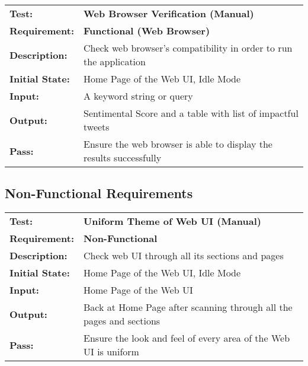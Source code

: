 \documentclass{article}
\begin{document}
	\begin{mdframed}[linewidth=1pt]%
	\begin{tabularx}{\textwidth}{@{}p{3cm}X@{}}
	{\bf Test:} & {\bf Web Browser Verification (Manual)}\\[\baselineskip]
	{\bf Requirement:} & {\bf Functional (Web Browser)}\\[\baselineskip]
	{\bf Description:} & Check web browser's compatibility in order to run the application\\[0.5\baselineskip]
	{\bf Initial State:} &  Home Page of the Web UI, Idle Mode\\[0.5\baselineskip]
	{\bf Input:} &  A keyword string or query\\[0.5\baselineskip]
	{\bf Output:} & Sentimental Score and a table with list of impactful tweets\\[0.5\baselineskip]
	{\bf Pass:} & Ensure the web browser is able to display the results successfully
	\end{tabularx}
	\end{mdframed}

		
	\newpage
	\subsection{Non-Functional Requirements}

	\begin{mdframed}[linewidth=1pt]%
	\begin{tabularx}{\textwidth}{@{}p{3cm}X@{}}
	{\bf Test:} & {\bf Uniform Theme of Web UI  (Manual)}\\[\baselineskip]
	{\bf Requirement:} & {\bf Non-Functional}\\[\baselineskip]
	{\bf Description:} & Check web UI through all its sections and pages\\[0.5\baselineskip]
	{\bf Initial State:} &  Home Page of the Web UI, Idle Mode\\[0.5\baselineskip]
	{\bf Input:} &  Home Page of the Web UI\\[0.5\baselineskip]
	{\bf Output:} & Back at Home Page after scanning through all the pages and sections\\[0.5\baselineskip]
	{\bf Pass:} & Ensure the look and feel of every area of the Web UI is uniform
	\end{tabularx}
	\end{mdframed}
\end{document}
